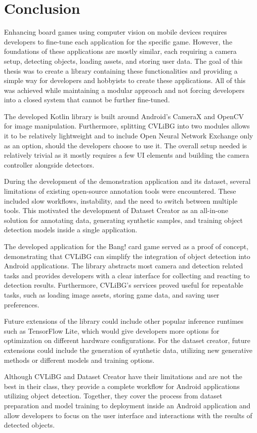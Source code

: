 \chapter{Conclusion}

Enhancing board games using computer vision on mobile devices requires developers to fine-tune each application for the specific game. However, the foundations of these applications are mostly similar, each requiring a camera setup, detecting objects, loading assets, and storing user data. The goal of this thesis was to create a library containing these functionalities and providing a simple way for developers and hobbyists to create these applications. All of this was achieved while maintaining a modular approach and not forcing developers into a closed system that cannot be further fine-tuned.

The developed Kotlin library is built around Android's CameraX and OpenCV for image manipulation. Furthermore, splitting CVLiBG into two modules allows it to be relatively lightweight and to include Open Neural Network Exchange only as an option, should the developers choose to use it. The overall setup needed is relatively trivial as it mostly requires a few UI elements and building the camera controller alongside detectors.

During the development of the demonstration application and its dataset, several limitations of existing open-source annotation tools were encountered. These included slow workflows, instability, and the need to switch between multiple tools. This motivated the development of Dataset Creator as an all-in-one solution for annotating data, generating synthetic samples, and training object detection models inside a single application.

The developed application for the Bang! card game served as a proof of concept, demonstrating that CVLiBG can simplify the integration of object detection into Android applications. The library abstracts most camera and detection related tasks and provides developers with a clear interface for collecting and reacting to detection results. Furthermore, CVLiBG's services proved useful for repeatable tasks, such as loading image assets, storing game data, and saving user preferences.

Future extensions of the library could include other popular inference runtimes such as TensorFlow Lite, which would give developers more options for optimization on different hardware configurations. For the dataset creator, future extensions could include the generation of synthetic data, utilizing new generative methods or different models and training options.

Although CVLiBG and Dataset Creator have their limitations and are not the best in their class, they provide a complete workflow for Android applications utilizing object detection. Together, they cover the process from dataset preparation and model training to deployment inside an Android application and allow developers to focus on the user interface and interactions with the results of detected objects.

